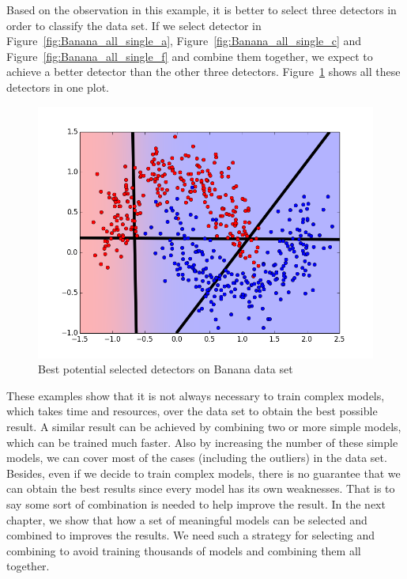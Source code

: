 Based on the observation in this example, it is better to select three detectors in order to classify the data set. If we select detector in Figure~\ref{fig:Banana_all_single_a}, Figure~\ref{fig:Banana_all_single_c} and Figure~\ref{fig:Banana_all_single_f}  and combine them together, we  expect to achieve a better detector than the other three detectors.  Figure~\ref{fig::combined_banana_roc} shows all these detectors in one plot.


\begin{figure}[H]
\centering
\includegraphics[scale=0.6]{figs/Banana/9999999-combined_selected_before_combination}
\caption{Best potential selected detectors on Banana data set}
\label{fig::combined_banana_roc}
\end{figure}

These examples show that it is not always necessary to train complex models, which takes time and resources, over the data set to obtain the best possible result. A similar result can be achieved by combining two or more simple models, which can be trained much faster. Also by increasing the number of these simple models, we can cover most of the cases (including the outliers) in the data set. Besides, even if we decide to train complex models, there is no guarantee that we can obtain the best results 
since every model has its own weaknesses. %
That is to say some sort of combination is needed to help improve the result. %
In the next chapter, we show that how a set of meaningful models can be selected and combined to improves the results. We need such a strategy for selecting and combining to avoid training thousands of models and combining them all together. 

